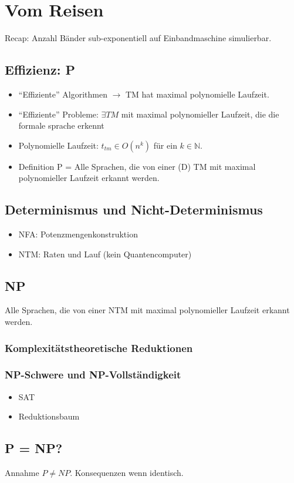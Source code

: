\chapter{Vom Reisen}
Recap: Anzahl Bänder sub-exponentiell auf Einbandmaschine simulierbar.
\section{Effizienz: P}
\begin{itemize}
    \item ``Effiziente'' Algorithmen $\rightarrow$ TM hat maximal polynomielle Laufzeit.
    \item ``Effiziente'' Probleme: $\exists TM$ mit maximal polynomieller Laufzeit,
        die die formale sprache erkennt 
    \item Polynomielle Laufzeit: $t_{tm} \in O(n^k)$ für ein $k \in \mathbb{N}$.
    \item Definition P = Alle Sprachen,
        die von einer (D) TM mit maximal polynomieller Laufzeit erkannt werden.
\end{itemize}
\section{Determinismus und Nicht-Determinismus}
\begin{itemize}
    \item NFA: Potenzmengenkonstruktion
    \item NTM: Raten und Lauf (kein Quantencomputer) 
\end{itemize}
\section{NP}
Alle Sprachen, die von einer NTM mit maximal polynomieller Laufzeit erkannt werden.
\subsection{Komplexitätstheoretische Reduktionen}

\subsection{NP-Schwere und NP-Vollständigkeit}
\begin{itemize}
    \item SAT
    \item Reduktionsbaum
\end{itemize}

\section{P = NP?}
Annahme $P \neq NP$.
Konsequenzen wenn identisch.
